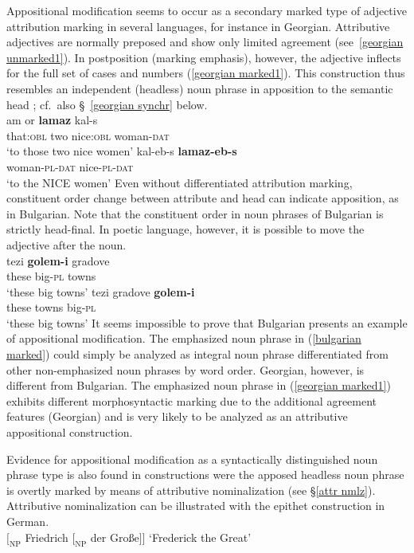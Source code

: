 Appositional modification seems to occur as a secondary marked type of adjective attribution marking in several languages, for instance in Georgian. Attributive adjectives are normally preposed and show only limited agreement (see~\ref{georgian unmarked1}). In postposition (marking emphasis), however, the adjective inflects for the full set of cases and numbers (\ref{georgian marked1}). This construction thus resembles an independent (headless) noun phrase in apposition to the semantic head \citep[652, 677]{testelec1998}; cf.~also \S~\ref{georgian synchr} below.
\ea
{}\\
\ea \label{georgian unmarked1}
\gll	am or \textbf{lamaz} kal-s\\
	that:\textsc{obl} two nice:\textsc{obl} woman-\textsc{dat}\\
\glt	‘to those two nice women’
\ex \label{georgian marked1}
\gll	kal-eb-s \textbf{lamaz-eb-s}\\
	woman-\textsc{pl}-\textsc{dat} nice-\textsc{pl}-\textsc{dat}\\
\glt	‘to the NICE women’
\z
\z
Even without differentiated attribution marking, constituent order change between attribute and head can indicate apposition, as in Bulgarian. Note that the constituent order in noun phrases of Bulgarian is strictly head-final. In poetic language, however, it is possible to move the adjective after the noun.
\ea
{}\\
\ea
\gll	tezi \textbf{golem-i} gradove\\
	these big-\textsc{pl} towns\\
\glt	‘these big towns’
\ex	\label{bulgarian marked}
\gll	tezi gradove \textbf{golem-i}\\
	these towns big-\textsc{pl}\\
\glt	‘these big towns’
\z
\z
It seems impossible to prove that Bulgarian presents an example of appositional modification. The emphasized noun phrase in (\ref{bulgarian marked}) could simply be analyzed as integral noun phrase differentiated from other non-emphasized noun phrases by word order. Georgian, however, is different from Bulgarian. The emphasized noun phrase in (\ref{georgian marked1}) exhibits different morphosyntactic marking due to the additional agreement features (Georgian) and is very likely to be analyzed as an attributive appositional construction.

Evidence for appositional modification as a syntactically distinguished noun phrase type is also found in constructions were the apposed headless noun phrase is overtly marked by means of attributive nominalization (see \S \ref{attr nmlz}). Attributive nominalization can be illustrated with the epithet construction in German.
\ea 
{}\\
$[_\textrm{NP}$ Friedrich $[_\textrm{NP}$ der Gro{ß}e$] ]$ \textrm{‘Frederick the Great’}
\z
